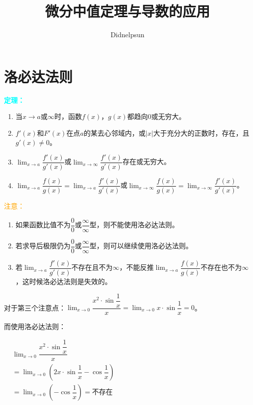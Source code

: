 \documentclass[UTF8, 12pt]{ctexart}
\author{Didnelpsun}
\title{微分中值定理与导数的应用}
\date{}
\begin{document}
\maketitle
\pagestyle{empty}
\thispagestyle{empty}
\tableofcontents
\thispagestyle{empty}
\newpage
\pagestyle{plain}
\setcounter{page}{1}

\section{洛必达法则}

\textcolor{aqua}{\textbf{定理：}}

\begin{enumerate}
    \item 当$x\to a\text{或}\infty$时，函数$f(x)$，$g(x)$都趋向0或无穷大。
    \item $f'(x)$和$F'(x)$在点$a$的某去心邻域内，或$\vert x\vert$大于充分大的正数时，存在，且$g'(x)\neq 0$。
    \item $\lim_{x\to a}\dfrac{f'(x)}{g'(x)}$或$\lim_{x\to\infty}\dfrac{f'(x)}{g'(x)}$存在或无穷大。
    \item $\lim_{x\to a}\dfrac{f(x)}{g(x)}=\lim_{x\to a}\dfrac{f'(x)}{g'(x)}$或$\lim_{x\to\infty}\dfrac{f(x)}{g(x)}=\lim_{x\to\infty}\dfrac{f'(x)}{g'(x)}$。
\end{enumerate}

\textcolor{orange}{注意：}

\begin{enumerate}
    \item 如果函数比值不为$\dfrac{0}{0}$或$\dfrac{\infty}{\infty}$型，则不能使用洛必达法则。
    \item 若求导后极限仍为$\dfrac{0}{0}$或$\dfrac{\infty}{\infty}$型，则可以继续使用洛必达法则。
    \item 若$\lim_{x\to a}\dfrac{f'(x)}{g'(x)}$不存在且不为$\infty$，不能反推$\lim_{x\to a}\dfrac{f(x)}{g(x)}$不存在也不为$\infty$，这时候洛必达法则是失效的。
\end{enumerate}

对于第三个注意点：$\lim_{x\to 0}\dfrac{x^2\cdot\sin\dfrac{1}{x}}{x}=\lim_{x\to 0}x\cdot\sin\dfrac{1}{x}=0$。

而使用洛必达法则：

$
\begin{aligned}
    & \lim_{x\to 0}\dfrac{x^2\cdot\sin\dfrac{1}{x}}{x} \\
    & =\lim_{x\to 0}\left(2x\cdot\sin\dfrac{1}{x}-\cos\dfrac{1}{x}\right) \\
    & =\lim_{x\to 0}\left(-\cos\dfrac{1}{x}\right)=\text{不存在}
\end{aligned}
$
\end{document}
